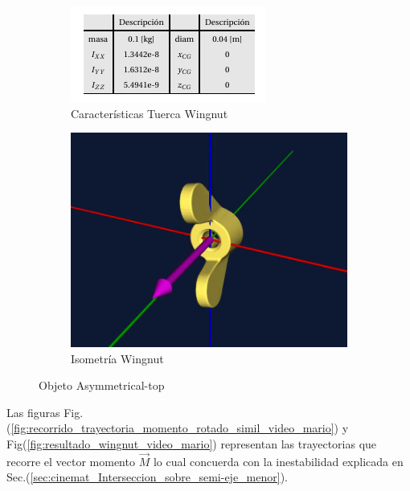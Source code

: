 \documentclass[oneside,a4paper,english,links]{amca}
\begin{document}
\begin{figure}[h]
\begin{subfigure}{.55\textwidth}
  \centering
  \includegraphics[width=.7\linewidth]{Figuras/detalles_wingnut.png}
  \caption{Caracter\'isticas Tuerca Wingnut}
  \label{fig:carac_tuerca_wingnut}
\end{subfigure}
\begin{subfigure}{.55\textwidth}
  \centering
  \includegraphics[width=.6\linewidth]{Figuras/wingnut.png}
  \caption{Isometr\'ia Wingnut}
  \label{fig:isometria_wingnut}
\end{subfigure}
\caption{Objeto Asymmetrical-top}
\label{fig:carac_objeto_wingnut}
\end{figure}


Las figuras Fig.(\ref{fig:recorrido_trayectoria_momento_rotado_simil_video_mario}) y Fig(\ref{fig:resultado_wingnut_video_mario}) representan las trayectorias que recorre el vector momento $\vec{M}$ lo cual concuerda con la inestabilidad explicada en Sec.(\ref{sec:cinemat_Interseccion_sobre_semi-eje_menor}). 
\end{document}
